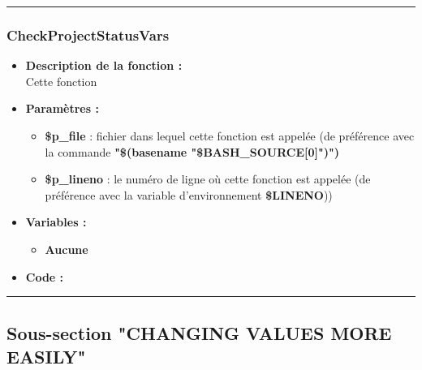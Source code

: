 \documentclass[a4paper,10pt]{article}
\begin{document}
\color{blue}\par\noindent\rule{\textwidth}{0.4pt}\color{white}

\color{blue}
\subsubsection{CheckProjectStatusVars}\color{white}
\begin{itemize}
    \item \textbf{Description de la fonction :}\\
    Cette fonction\\[1\baselineskip]

    \item \textbf{Paramètres :}
    \begin{itemize}
        \item \color{orange}\textbf{\$p\_file}\color{white} : fichier dans lequel cette fonction est appelée (de préférence avec la commande \textbf{"\$(\color{gray}basename \color{white}"\color{orange}\$BASH\_SOURCE[0]\color{white}")")}\\[1\baselineskip]

        \item \color{orange}\textbf{\$p\_lineno}\color{white} : le numéro de ligne où cette fonction est appelée (de préférence avec la variable d'environnement \textbf{\color{orange}\$LINENO}))\\[1\baselineskip]
    \end{itemize}

    \item \textbf{Variables :}
    \begin{itemize}
        \item \textbf{Aucune}\\[1\baselineskip]
    \end{itemize}

    \item \textbf{Code :}
\end{itemize}



\color{green}\par\noindent\rule{\textwidth}{0.4pt}\color{white}

\color{green}
\subsection{Sous-section "CHANGING VALUES MORE EASILY"}\color{white}
\end{document}
